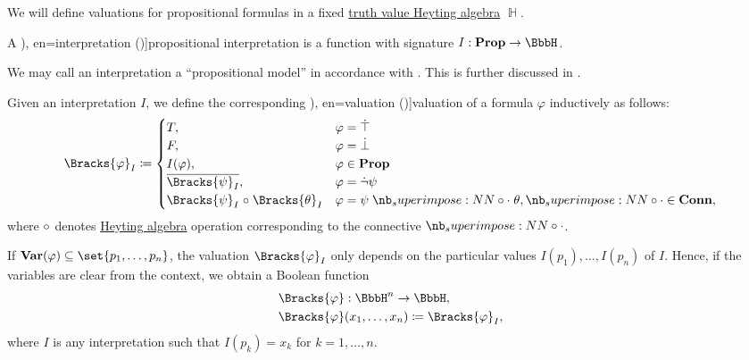 \begin{definition}\label{def:propositional_valuation}\mimprovised
  We will define valuations for propositional formulas in a fixed \hyperref[def:truth_value_algebra]{truth value Heyting algebra} \( \BbbH \).

  \begin{thmenum}
     A \term[ru=интерпретация (\cite[17]{Герасимов2011}), en=interpretation (\cite[10]{Smullyan1995})]{propositional interpretation} is a function with signature \( I: \op*{Prop} \to \BbbH \).

    We may call an interpretation a \enquote{propositional model} in accordance with . This is further discussed in .

     Given an interpretation \( I \), we define the corresponding \term[ru=значение истинности (формулы) (\cite[8]{Эдельман1975}), en=valuation (\cite[10]{Smullyan1995})]{valuation} of a formula \( \varphi \) inductively as follows:
    \begin{equation}\label{eq:def:propositional_valuation/formula_valuation}
      \Bracks{\varphi}_I \coloneqq \begin{cases}
        T,                                         &\varphi = \syntop \\
        F,                                         &\varphi = \synbot \\
        I(\varphi),                                &\varphi \in \op*{Prop} \\
        \oline{\Bracks{\psi}_I},                   &\varphi = \synneg \psi \\
        \Bracks{\psi}_I \relcirc \Bracks{\theta}_I &\varphi = \psi \syncirc \theta, {\syncirc} \in \op*{Conn},
      \end{cases}
    \end{equation}
    where \( \relcirc \) denotes \hyperref[def:heyting_algebra]{Heyting algebra} operation corresponding to the connective \( \syncirc \).

     If \( \op*{Var}(\varphi) \subseteq \set{ p_1, \ldots, p_n } \), the valuation \( \Bracks{\varphi}_I \) only depends on the particular values \( I(p_1), \ldots, I(p_n) \) of \( I \). Hence, if the variables are clear from the context, we obtain a Boolean function
    \begin{equation*}
      \begin{aligned}
        &\Bracks{\varphi}: \BbbH^n \to \BbbH, \\
        &\Bracks{\varphi}(x_1, \ldots, x_n) \coloneqq \Bracks{\varphi}_I,
      \end{aligned}
    \end{equation*}
    where \( I \) is any interpretation such that \( I(p_k) = x_k \) for \( k = 1, \ldots, n \).


\end{thmenum}
\end{definition}
